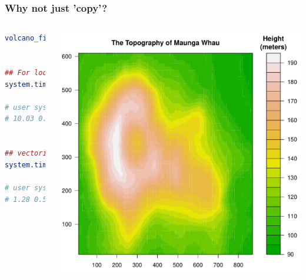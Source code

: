 \documentclass{beamer}
\begin{document}
\begin{frame}[fragile]
\frametitle{Why not just 'copy'?}

\begin{columns}[c]
\begin{lstlisting}[language = R]
volcano_filled.contour()


## For loop 
system.time(grid.echo())

# user system elapsed
# 10.03 0.23 10.32


## vectorizetion
system.time(grid.echo())

# user system elapsed
# 1.28 0.53 1.82
\end{lstlisting}

\begin{center}
\includegraphics{plot/filled_example_1}
\end{center}

\end{columns}
\end{frame}



\end{document}

